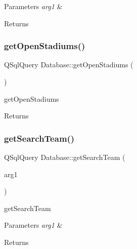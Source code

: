 \begin{DoxyParams}{Parameters}
{\em arg1} & \\
\hline
\end{DoxyParams}
\begin{DoxyReturn}{Returns}

\end{DoxyReturn}
\mbox{\label{class_database_a19033eeb6c069ffb365f06da4a7b9b5e}} 
\subsubsection{\texorpdfstring{get\+Open\+Stadiums()}{getOpenStadiums()}}
{\footnotesize\ttfamily Q\+Sql\+Query Database\+::get\+Open\+Stadiums (\begin{DoxyParamCaption}{ }\end{DoxyParamCaption})}



get\+Open\+Stadiums 

\begin{DoxyReturn}{Returns}

\end{DoxyReturn}
\mbox{\label{class_database_a8181dd6904b67c1c6db97fc696583d65}} 
\subsubsection{\texorpdfstring{get\+Search\+Team()}{getSearchTeam()}}
{\footnotesize\ttfamily Q\+Sql\+Query Database\+::get\+Search\+Team (\begin{DoxyParamCaption}\item[{const Q\+String \&}]{arg1 }\end{DoxyParamCaption})}



get\+Search\+Team 


\begin{DoxyParams}{Parameters}
{\em arg1} & \\
\hline
\end{DoxyParams}
\begin{DoxyReturn}{Returns}

\end{DoxyReturn}
\mbox{\label{class_database_adc23956b138dca3e4d0b22354dfb3a6e}} 
